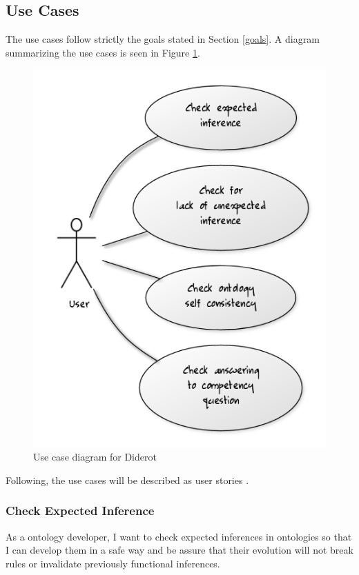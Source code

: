 \documentclass{report}
\begin{document}
\subsection{Use Cases}

The use cases follow strictly the goals stated in Section \ref{goals}. A diagram summarizing the use cases is seen
in Figure \ref{figUseCase}.

\begin{figure}[!hbt]
    \centering
    \label{figUseCase}
    \caption{Use case diagram for Diderot}
    \includegraphics[scale=0.5]{fig/use_case_diagram.png}
\end{figure}

Following, the use cases will be described as user stories \cite{beck04}.

\subsubsection{Check Expected Inference}

As a ontology developer, I want to check expected inferences in ontologies so that I can develop them
in a safe way and be assure that their evolution will not break rules or invalidate previously
functional inferences.
\end{document}
